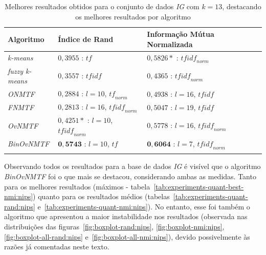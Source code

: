 \documentclass[
    12pt,                %
    oneside,            %
    a4paper,            %
    english,            %
    brazil                %
    ]{abntex2ppgsi}
\begin{document}
\begin{table}[H]
\centering
    \caption{Melhores resultados obtidos para o conjunto de dados \textit{IG} com $k = 13$, destacando os melhores resultados por algoritmo}
    \begin{tabular}{lll}
        \hline
        \textbf{Algoritmo} & \textbf{Índice de Rand} & \textbf{Informação Mútua Normalizada} \\
        \hline
        \textit{k-means}       & $0,3955$ : $\textit{tf}$                     & $0,5826*$ : $\textit{tfidf}_{norm}$ \\
        \textit{fuzzy k-means} & $0,3557$ : $\textit{tfidf}$                  & $0,4365$ : $\textit{tfidf}_{norm}$ \\
        \textit{ONMTF}         & $0,2884$ : $l=10$, $\textit{tf}_{norm}$      & $0,4938$ : $l=16$, $\textit{tfidf}$ \\
        \textit{FNMTF}         & $0,2813$ : $l=16$, $\textit{tfidf}_{norm}$   & $0,5047$ : $l=19$, $\textit{tfidf}$ \\
        \textit{OvNMTF}        & $0,4251*$ : $l=10$, $\textit{tfidf}_{norm}$  & $0,5778$ : $l=16$, $\textit{tfidf}_{norm}$ \\
        \textit{BinOvNMTF}     & $\mathbf{0,5743}$ : $l=10$, $\textit{tf}$    & $\mathbf{0,6064}$ : $l=7$, $\textit{tfidf}_{norm}$ \\
        \hline \\
    \end{tabular}
    \label{tab:experiments-quant-best-nmi:ig}
\end{table}

Observando todos os resultados para a base de dados \textit{IG} é visível que o algoritmo \textit{BinOvNMTF} foi o que mais se destacou, considerando ambas as medidas.
Tanto para os melhores resultados (máximos - tabela~\ref{tab:experiments-quant-best-nmi:nips}) quanto para os resultados médios (tabelas~\ref{tab:experiments-quant-rand:nips} e~\ref{tab:experiments-quant-nmi:nips}). No entanto, esse foi também o algoritmo que apresentou a maior instabilidade nos resultados (observada nas distribuições das figuras~\ref{fig:boxplot-rand:nips}, \ref{fig:boxplot-nmi:nips}, \ref{fig:boxplot-all-rand:nips} e~\ref{fig:boxplot-all-nmi:nips}), devido possivelmente às razões já comentadas neste texto. %
\end{document}
